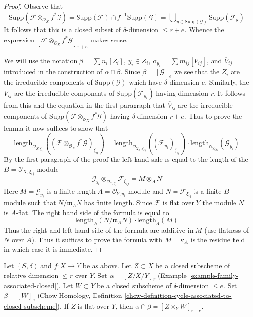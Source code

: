\begin{proof}
Observe that
$$
\text{Supp}(\mathcal{F} \otimes_{\mathcal{O}_X} f^*\mathcal{G}) =
\text{Supp}(\mathcal{F}) \cap f^{-1}\text{Supp}(\mathcal{G}) =
\bigcup\nolimits_{y \in \text{Supp}(\mathcal{G})} \text{Supp}(\mathcal{F}_y)
$$
It follows that this is a closed subset of $\delta$-dimension $\leq r + e$.
Whence the expression
$[\mathcal{F} \otimes_{\mathcal{O}_X} f^*\mathcal{G}]_{r + e}$
makes sense.

\medskip\noindent
We will use the notation
$\beta = \sum n_i[Z_i]$, $y_i \in Z_i$,
$\alpha_{y_i} = \sum m_{ij} [V_{ij}]$, and
$\overline{V}_{ij}$ introduced in the construction
of $\alpha \cap \beta$. Since $\beta = [\mathcal{G}]_e$
we see that the $Z_i$ are the irreducible components of
$\text{Supp}(\mathcal{G})$ which have $\delta$-dimension $e$.
Similarly, the $V_{ij}$ are the irreducible components
of $\text{Supp}(\mathcal{F}_{y_i})$ having dimension $r$.
It follows from this and the equation in the first
paragraph that $\overline{V}_{ij}$ are the irreducible
components of
$\text{Supp}(\mathcal{F} \otimes_{\mathcal{O}_X} f^*\mathcal{G})$
having $\delta$-dimension $r + e$.
Thus to prove the lemma it now suffices to show that
$$
\text{length}_{\mathcal{O}_{X, \xi_{ij}}}(
(\mathcal{F} \otimes_{\mathcal{O}_X} f^*\mathcal{G})_{\xi_{ij}})
=
\text{length}_{\mathcal{O}_{X_{y_i}, \xi_{ij}}}((\mathcal{F}_{y_i})_{\xi_{ij}})
\cdot
\text{length}_{\mathcal{O}_{Y, y_i}}(\mathcal{G}_{y_i})
$$
By the first paragraph of the proof the left hand side is equal to
the length of the $B = \mathcal{O}_{X, \xi_{ij}}$-module
$$
\mathcal{G}_{y_i}
\otimes_{\mathcal{O}_{Y, y_i}}
\mathcal{F}_{\xi_{ij}} =
M \otimes_A N
$$
Here $M = \mathcal{G}_{y_i}$ is a finite length
$A = \mathcal{O}_{Y, y_i}$-module and $N = \mathcal{F}_{\xi_{ij}}$
is a finite $B$-module such that $N/\mathfrak m_AN$ has finite length.
Since $\mathcal{F}$ is flat over $Y$ the module $N$ is $A$-flat.
The right hand side of the formula is equal to
$$
\text{length}_B(N/\mathfrak m_A N) \cdot \text{length}_A(M)
$$
Thus the right and left hand side of the formula are additive in $M$
(use flatness of $N$ over $A$). Thus it suffices to prove the
formula with $M = \kappa_A$ is the residue field in which
case it is immediate.
\end{proof}

\begin{lemma}
\label{lemma-action-closed}
Let $(S, \delta)$ and $f : X \to Y$ be as above. Let $Z \subset X$
be a closed subscheme of relative dimension $\leq r$ over $Y$.
Set $\alpha = [Z/X/Y]_r$ (Example \ref{example-family-associated-closed}).
Let $W \subset Y$ be a closed subscheme of $\delta$-dimension $\leq e$.
Set $\beta = [W]_e$ (Chow Homology, Definition
\ref{chow-definition-cycle-associated-to-closed-subscheme}).
If $Z$ is flat over $Y$, then $\alpha \cap \beta = [Z \times_Y W]_{r + e}$.
\end{lemma}

